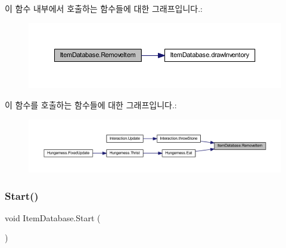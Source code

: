 \begin{DoxyCode}{0}

\end{DoxyCode}
이 함수 내부에서 호출하는 함수들에 대한 그래프입니다.\+:\nopagebreak
\begin{figure}[H]
\begin{center}
\leavevmode
\includegraphics[width=350pt]{d0/dc6/class_item_database_a86349d3b40c7195b530638ffd0d5d958_cgraph}
\end{center}
\end{figure}
이 함수를 호출하는 함수들에 대한 그래프입니다.\+:\nopagebreak
\begin{figure}[H]
\begin{center}
\leavevmode
\includegraphics[width=350pt]{d0/dc6/class_item_database_a86349d3b40c7195b530638ffd0d5d958_icgraph}
\end{center}
\end{figure}
\mbox{\label{class_item_database_a0891a7bd4b3213485d52e7b0fcbde30b}} 
\subsubsection{\texorpdfstring{Start()}{Start()}}
{\footnotesize\ttfamily void Item\+Database.\+Start (\begin{DoxyParamCaption}{ }\end{DoxyParamCaption})\hspace{0.3cm}{\ttfamily [private]}}



